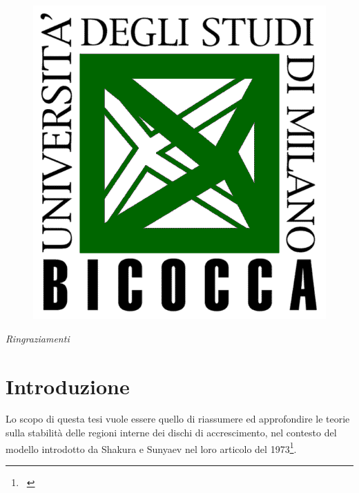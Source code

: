 \documentclass[a4paperbi]{article}
\newcommand{\textgreek}[1]{\begingroup\fontencoding{LGR}\selectfont#1\endgroup}
\begin{document}
\begin{titlepage}
	\begin{figure}[H]
		\centering
		\includegraphics[width=0.4\linewidth]{LogoBicocca}
		\label{fig:logobicocca}
	\end{figure} %
\vfill %
\end{titlepage}

\newpage
\vspace*{\fill}
\textit{Ringraziamenti}\\[2cm]

\vspace*{\fill}

\newpage
\tableofcontents

\newpage
\section{Introduzione}
Lo scopo di questa tesi vuole essere quello di riassumere ed approfondire le teorie sulla stabilità delle regioni interne dei dischi di accrescimento, nel contesto del modello introdotto da Shakura e Sunyaev nel loro articolo del 1973\footnote{~\cite{ShakuraSunyaev1973}}.
\end{document}
